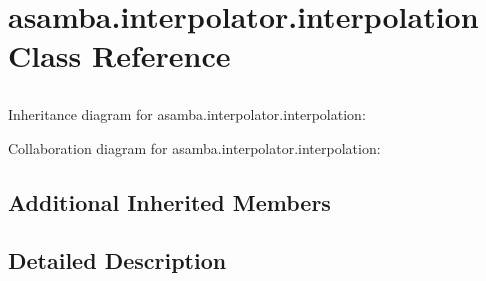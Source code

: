 \hypertarget{classasamba_1_1interpolator_1_1interpolation}{}\section{asamba.\+interpolator.\+interpolation Class Reference}
\label{classasamba_1_1interpolator_1_1interpolation}


\paragraph*{}

\subsection*{}

\subsection*{}

\subsection*{}

\subsection*{}

\subsection*{}

\subparagraph*{} 




Inheritance diagram for asamba.\+interpolator.\+interpolation\+:


Collaboration diagram for asamba.\+interpolator.\+interpolation\+:
\subsection*{Additional Inherited Members}


\subsection{Detailed Description}
\paragraph*{}

